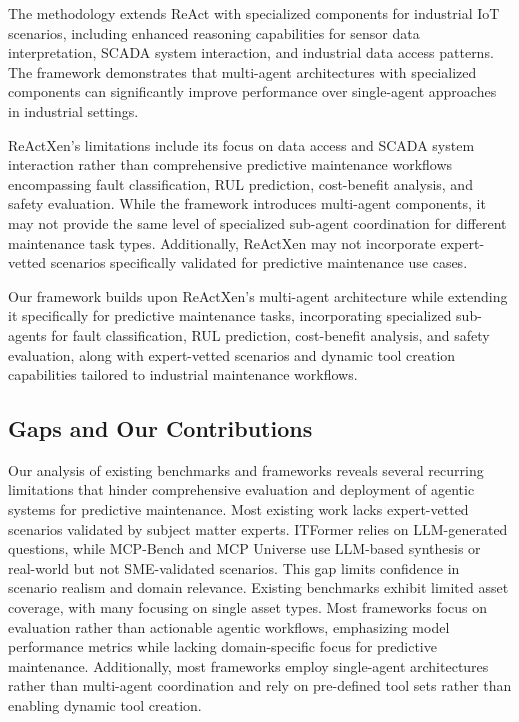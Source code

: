 \documentclass[conference]{IEEEtran}
\begin{document}
The methodology extends ReAct with specialized components for industrial IoT scenarios, including enhanced reasoning capabilities for sensor data interpretation, SCADA system interaction, and industrial data access patterns. The framework demonstrates that multi-agent architectures with specialized components can significantly improve performance over single-agent approaches in industrial settings.

ReActXen's limitations include its focus on data access and SCADA system interaction rather than comprehensive predictive maintenance workflows encompassing fault classification, RUL prediction, cost-benefit analysis, and safety evaluation. While the framework introduces multi-agent components, it may not provide the same level of specialized sub-agent coordination for different maintenance task types. Additionally, ReActXen may not incorporate expert-vetted scenarios specifically validated for predictive maintenance use cases.

Our framework builds upon ReActXen's multi-agent architecture while extending it specifically for predictive maintenance tasks, incorporating specialized sub-agents for fault classification, RUL prediction, cost-benefit analysis, and safety evaluation, along with expert-vetted scenarios and dynamic tool creation capabilities tailored to industrial maintenance workflows.

\subsection{Gaps and Our Contributions}

Our analysis of existing benchmarks and frameworks reveals several recurring limitations that hinder comprehensive evaluation and deployment of agentic systems for predictive maintenance. Most existing work lacks expert-vetted scenarios validated by subject matter experts. ITFormer relies on LLM-generated questions, while MCP-Bench and MCP Universe use LLM-based synthesis or real-world but not SME-validated scenarios. This gap limits confidence in scenario realism and domain relevance. Existing benchmarks exhibit limited asset coverage, with many focusing on single asset types. Most frameworks focus on evaluation rather than actionable agentic workflows, emphasizing model performance metrics while lacking domain-specific focus for predictive maintenance. Additionally, most frameworks employ single-agent architectures rather than multi-agent coordination and rely on pre-defined tool sets rather than enabling dynamic tool creation.
\end{document}
